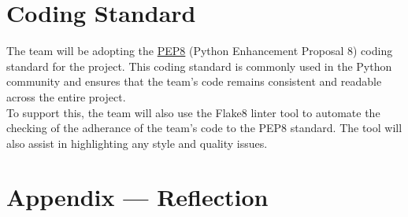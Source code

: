 \documentclass{article}
\begin{document}
\begin{table}[!htbp]
\begin{tabular}{|p{4cm}|p{4cm}|p{5cm}|}
\end{tabular}

\end{table}


\section{Coding Standard}
The team will be adopting the \href{https://peps.python.org/pep-0008/}{PEP8} (Python Enhancement Proposal 8) 
coding standard for the project. This coding standard is commonly used in the 
Python community and ensures that the team's code remains 
consistent and readable across the entire project.\\
To support this, the team will also use the Flake8 linter tool to automate the 
checking of the adherance of the team's code to the PEP8 standard. The tool will
also assist in highlighting any style and quality issues.

\newpage{}

\section*{Appendix --- Reflection}



\end{document}
